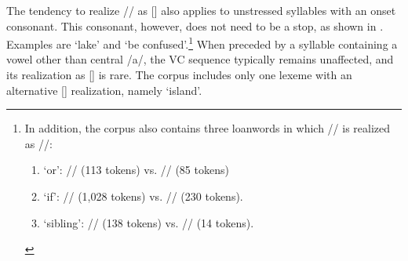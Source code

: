The tendency to realize // as [] also applies to unstressed syllables with an onset consonant. This consonant, however, does not need to be a stop, as shown in . Examples are  ‘lake’ and  ‘be confused’.\footnote{In addition, the corpus also contains three loanwords in which // is realized as //:
\begin{enumerate}[label=(\arabic*)]
\setlength{\itemsep}{0em}
\item {} ‘or’: // (113 tokens) vs. // (85 tokens)
\item {} ‘if’: // (1,028 tokens) vs. // (230 tokens).
\item {} ‘sibling’: // (138 tokens) vs. // (14 tokens).
\end{enumerate}
}
When preceded by a syllable containing a vowel other than central /a/, the VC sequence typically remains unaffected, and its realization as [] is rare. The corpus includes only one lexeme with an alternative [] realization, namely  ‘island’.

